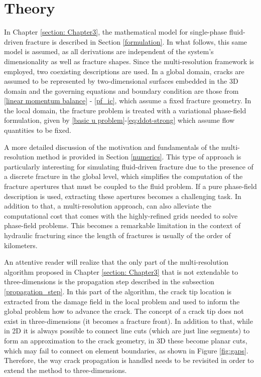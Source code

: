 \section{Theory}
\label{section: Chapter4/theory}

In Chapter \ref{section: Chapter3}, the mathematical model for single-phase fluid-driven fracture is described in Section \ref{formulation}. In what follows, this same model is assumed, as all derivations are independent of the system's dimensionality as well as fracture shapes. Since the multi-resolution framework is employed, two coexisting descriptions are used. In a global domain, cracks are assumed to be represented by two-dimensional surfaces embedded in the 3D domain and the governing equations and boundary condition are those from \eqref{linear momentum balance} - \eqref{pf_ic}, which assume a fixed fracture geometry. In the local domain, the fracture problem is treated with a variational phase-field formulation, given by \eqref{basic u problem}-\eqref{eq:ddot-strong} which assume flow quantities to be fixed.

A more detailed discussion of the motivation and fundamentals of the multi-resolution method is provided in Section \ref{numerics}. This type of approach is particularly interesting for simulating fluid-driven fracture due to the presence of a discrete fracture in the global level, which simplifies the computation of the fracture apertures that must be coupled to the fluid problem. If a pure phase-field description is used, extracting these apertures becomes a challenging task. In addition to that, a multi-resolution approach, can also alleviate the computational cost that comes with the highly-refined grids needed to solve phase-field problems. This becomes a remarkable limitation in the context of hydraulic fracturing since the length of fractures is usually of the order of kilometers.


An attentive reader will realize that the only part of the multi-resolution algorithm proposed in Chapter \ref{section: Chapter3} that is not extendable to three-dimensions is the propagation step described in the subsection \ref{propagation_step}. In this part of the algorithm, the crack tip location is extracted from the damage field in the local problem and used to inform the global problem how to advance the crack. The concept of a crack tip does not exist in three-dimensions (it becomes a fracture front). In addition to that, while in 2D it is always possible to connect line cuts (which are just line segments) to form an approximation to the crack geometry, in 3D these become planar cuts, which may fail to connect on element boundaries, as shown in Figure \ref{fig:gaps}. Therefore, the way crack propagation is handled needs to be revisited in order to extend the method to three-dimensions.

